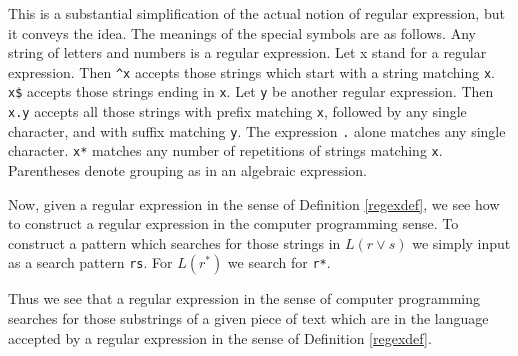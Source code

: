 \begin{ap}
This is a substantial simplification of the actual notion of regular
expression, but it conveys the idea. The meanings of the special
symbols are as follows. Any string of letters and numbers is a regular
expression. Let x stand for a regular expression. Then
\verb|^|\texttt{x} accepts those strings which start with a string
matching \texttt{x}.  \texttt{x\$} accepts those strings ending in
\texttt{x}. Let \texttt{y} be another regular expression. Then
\texttt{x.y} accepts all those strings with prefix matching
\texttt{x}, followed by any single character, and with suffix matching
\texttt{y}. The expression \verb|.| alone matches any single
character. \verb|x*| matches any number of repetitions of strings
matching \texttt{x}. Parentheses denote grouping as in an algebraic
expression.

Now, given a regular expression in the sense of Definition
\ref{regexdef}, we see how to construct a regular expression in the
computer programming sense. To construct a pattern which searches for
those strings in $L(r \vee s)$ we simply input as a search pattern
\texttt{rs}. For $L(r^*)$ we search for \verb|r*|.

Thus we see that a regular expression in the sense of computer
programming searches for those substrings of a given piece of text
which are in the language accepted by a regular expression in the
sense of Definition \ref{regexdef}.
\end{ap}

